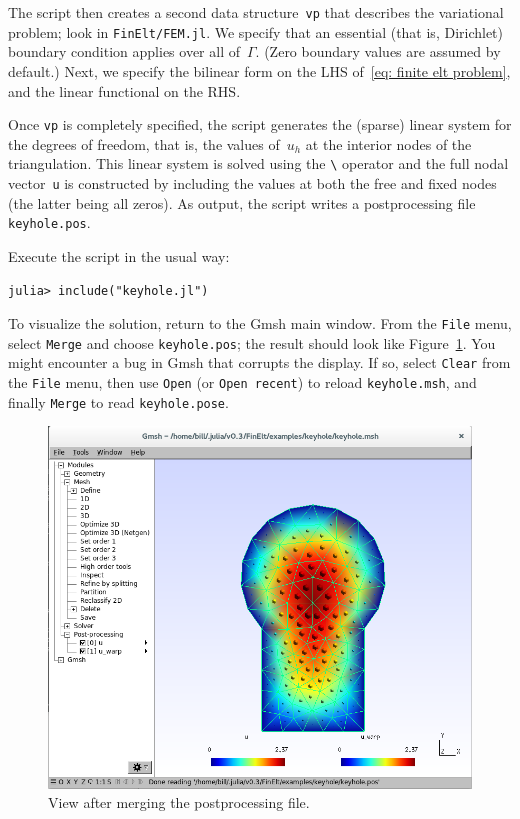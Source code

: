 \documentclass[a4paper,12pt]{article}
\begin{document}
The script then creates a second data structure~\verb!vp! that 
describes the variational problem; look in \verb!FinElt/FEM.jl!.  We 
specify that an essential (that is, Dirichlet) boundary condition 
applies over all of~$\Gamma$.  (Zero boundary values are assumed by 
default.)  Next, we specify the bilinear form on the LHS 
of~\eqref{eq: finite elt problem}, and the linear functional on the 
RHS.

Once \verb!vp! is completely specified, the script generates the 
(sparse) linear system for the degrees of freedom, that is, the 
values of~$u_h$ at the interior nodes of the triangulation.  This 
linear system is solved using the \verb!\! operator and the full 
nodal vector~\verb!u! is constructed by including the values at both 
the free and fixed nodes (the latter being all zeros).  As output, 
the script writes a postprocessing file \verb!keyhole.pos!.

Execute the script in the usual way:
\begin{verbatim}
julia> include("keyhole.jl")
\end{verbatim}
To visualize the solution, return to the Gmsh main window.  From 
the \verb!File! menu, select \verb!Merge! and choose 
\verb!keyhole.pos!; the result should look like 
Figure~\ref{fig: postprocess}.  You might encounter a bug in Gmsh 
that corrupts the display.  If so, select \verb!Clear! from the 
\verb!File! menu, then use \verb!Open! (or \verb!Open recent!) to 
reload \verb!keyhole.msh!, and finally \verb!Merge! to read 
\verb!keyhole.pose!.

\begin{figure}
\caption{View after merging the postprocessing file.}
\label{fig: postprocess}
\begin{center}
\includegraphics[scale=0.4]{images/postprocess.png}
\end{center}
\end{figure}
\end{document}
